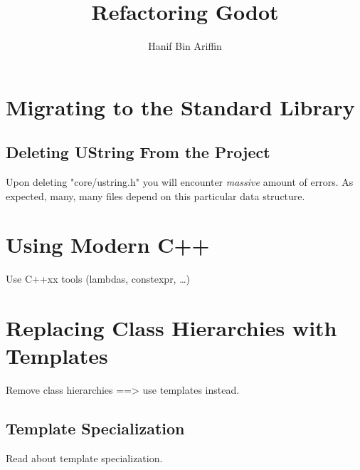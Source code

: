 \documentclass[a4paper,10pt]{book}
\title{Refactoring Godot}
\author{Hanif Bin Ariffin}
\begin{document}
\maketitle
\tableofcontents

\newpage
\section{Migrating to the Standard Library}

\subsection{Deleting UString From the Project}

Upon deleting "core/ustring.h" you will encounter \textit{massive} amount of errors.
As expected, many, many files depend on this particular data structure.

\newpage
\section{Using Modern C++}

Use C++xx tools (lambdas, constexpr, \dots)

\newpage
\section{Replacing Class Hierarchies with Templates}

Remove class hierarchies ==> use templates instead.
\subsection{Template Specialization}

Read about template specialization.
\end{document}
